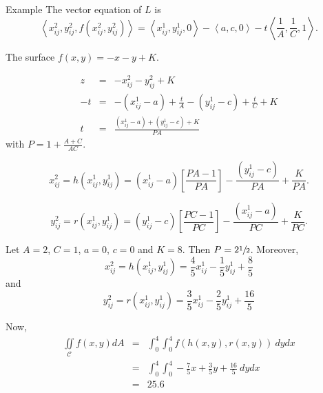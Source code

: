 \documentclass[a4paper,10pt]{article}
\begin{document}
\begin{section}{Example}
The vector equation of $L$ is
\begin{equation}
\left <x_{ij}^2,y_{ij}^2,f(x_{ij}^2,y_{ij}^2) \right > = \left < x_{ij}^1, y_{ij}^1, 0\right > - \left < a, c, 0\right > - t \left < \frac{1}{A},\frac{1}{C},1\right >.  
\end{equation}

The surface $f(x,y) = -x - y + K$.

\begin{eqnarray}
z &=& - x_{ij}^2 - y_{ij}^2 + K\\
-t &=& -(x_{ij}^1 - a) + \frac{t}{A} - (y_{ij}^1 - c) + \frac{t}{C} + K\\
t &=& \frac{(x_{ij}^1 - a) + (y_{ij}^1 - c) + K}{PA}
\end{eqnarray}
with $P = 1 + \frac{A+C}{AC}$.

\begin{equation}
x_{ij}^2 = h(x_{ij}^1,y_{ij}^1) = (x_{ij}^1 - a)\left [ \frac{PA-1}{PA} \right ] - \frac{(y_{ij}^1 - c)}{PA} + \frac{K}{PA}.
\end{equation}

\begin{equation}
y_{ij}^2 = r(x_{ij}^1,y_{ij}^1) = (y_{ij}^1 - c)\left [ \frac{PC-1}{PC} \right ] - \frac{(x_{ij}^1 - a)}{PC} + \frac{K}{PC}.  
\end{equation}

Let $A=2$, $C=1$, $a = 0$, $c = 0$ and $K=8$. Then $P = 2\sfrac{1}{2}$. Moreover, 
\begin{equation}
x_{ij}^2 = h(x_{ij}^1,y_{ij}^1) = \frac{4}{5} x_{ij}^1 - \frac{1}{5} y_{ij}^1 + \frac{8}{5}  
\end{equation}
and
\begin{equation}
y_{ij}^2 = r(x_{ij}^1,y_{ij}^1) = \frac{3}{5} x_{ij}^1 - \frac{2}{5} y_{ij}^1 + \frac{16}{5}  
\end{equation}

Now,
\begin{eqnarray}
\iint\limits_{\!\mathcal{C}} f(x,y) dA &=& \int_0^4\int_0^4 f(h(x,y),r(x,y))~dydx\\
&=& \int_0^4 \int_0^4 -\frac{7}{5}x + \frac{3}{5} y + \frac{16}{5}~dydx\\
&=& 25.6
\end{eqnarray}




\end{section}
\end{document}
